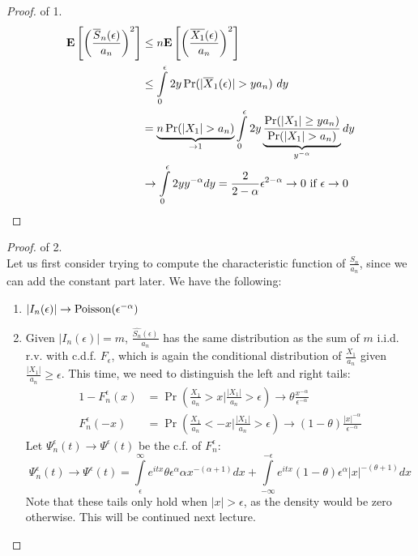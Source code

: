 \documentclass[../main/main.tex]{subfiles}
\begin{document}
\begin{proof} of 1.
	\begin{align*}
		\E \left[ \left( \frac{\overline{S}_n(\epsilon)}{a_n} \right)^2 \right] & \leq n \E \left[ \left( \frac{\overline{X_1}(\epsilon)}{a_n} \right)^2 \right]                                                                    \\
		                                                                        & \leq \int\limits_{0}^{\epsilon} 2 y \Pr(|\overline{X}_1(\epsilon)| > ya_n) ~ dy                                                                   \\
		                                                                        & = \underbrace{n \Pr(|X_1|>a_n)}_{\to 1}\int\limits_{0}^{\epsilon} 2 y \underbrace{\frac{\Pr(|X_1| \geq ya_n)}{\Pr(|X_1|>a_n)}}_{ y^{-\alpha}}  dy \\
		                                                                        & \to \int\limits_{0}^{\epsilon} 2y y^{-\alpha}dy                  = \frac{2}{2-\alpha} \epsilon^{2-\alpha} \to 0 \text{ if }\epsilon \to 0
	\end{align*}
\end{proof}

\begin{proof} of 2.\\
	Let us first consider trying to compute the characteristic function of $\frac{S_n}{a_n}$, since we can add the constant part later. We have the following:

	\begin{enumerate}[label=(\roman*)]
		\item $|I_n(\epsilon)| \to \text{Poisson}(\epsilon^{-\alpha})$
		\item Given $|I_n(\epsilon)|=m$, $\frac{\hat{S_n}(\epsilon)}{a_n}$ has the same distribution as the sum of $m$ i.i.d. r.v. with c.d.f. $F_{\epsilon}$, which is again the conditional distribution of $\frac{X_1}{a_n}$ given $\frac{|X_1|}{a_n} \geq \epsilon$. This time, we need to distinguish the left and right tails:
		      \begin{align*}
			      1-F_n^{\epsilon}(x) & = \Pr \left( \frac{X_1}{a_n} > x \bigg\vert \frac{|X_1|}{a_n}>\epsilon\right) \to \theta \frac{x^{-\alpha}}{\epsilon^{-\alpha}}        \\
			      F_n^{\epsilon}(-x)  & = \Pr \left( \frac{X_1}{a_n} <- x \bigg\vert \frac{|X_1|}{a_n}>\epsilon\right) \to (1-\theta) \frac{|x|^{-\alpha}}{\epsilon^{-\alpha}}
		      \end{align*}
		      Let $\Psi_n^{\epsilon}(t) \to \Psi^{\epsilon}(t)$ be the c.f. of $F_n^{\epsilon}$: \[
			      \Psi_n^{\epsilon}(t) \to \Psi^{\epsilon}(t) = \int\limits_{\epsilon}^{\infty}e^{itx}\theta \epsilon^{\alpha} \alpha x^{-(\alpha+1)}dx + \int\limits_{-\infty}^{-\epsilon} e^{itx} (1-\theta)\epsilon^{\alpha}|x|^{-(\theta+1)}dx
		      \] Note that these tails only hold when $|x|>\epsilon$, as the density would be zero otherwise.
		      This will be continued next lecture.
	\end{enumerate}
\end{proof}
\end{document}
